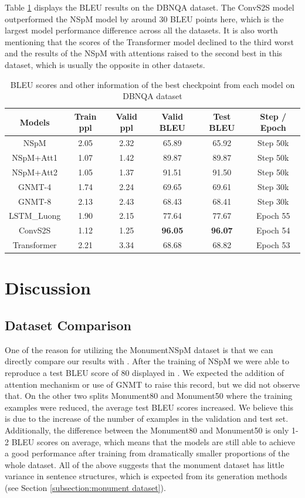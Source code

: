 Table \ref{table:dbnqa bleu} displays the BLEU results on the DBNQA dataset. The ConvS2S model outperformed the NSpM model by around 30 BLEU points here, which is the largest model performance difference across all the datasets. It is also worth mentioning that the scores of the Transformer model declined to the third worst and the results of the NSpM with attentions raised to the second best in this dataset, which is usually the opposite in other datasets.

\begin{table}[H]
\centering
\caption{BLEU scores and other information of the best checkpoint from each model on DBNQA dataset}
\label{table:dbnqa bleu}
\begin{tabular}{c|c|c|c|c|c}
Models & Train ppl & Valid ppl & \textbf{Valid BLEU} & \textbf{Test BLEU} & Step / Epoch \\
\hline
NSpM & 2.05 & 2.32 & 65.89 & 65.92 & Step 50k \\
NSpM+Att1 & 1.07 & 1.42 & 89.87 & 89.87 & Step 50k \\
NSpM+Att2 & 1.05 & 1.37 & 91.51 & 91.50 & Step 50k \\
GNMT-4 & 1.74 & 2.24 & 69.65 & 69.61 & Step 30k \\
GNMT-8 & 2.13 & 2.43 & 68.43 & 68.41 & Step 30k \\
LSTM\_Luong & 1.90 & 2.15 & 77.64 & 77.67 & Epoch 55 \\
ConvS2S & 1.12 & 1.25 & \textbf{96.05} & \textbf{96.07} & Epoch 54 \\
Transformer & 2.21 & 3.34 & 68.68 & 68.82 & Epoch 53 \\
\end{tabular}
\end{table}

\section{Discussion} \label{section:discussion}

\subsection{Dataset Comparison}

One of the reason for utilizing the MonumentNSpM dataset is that we can directly compare our results with \cite{Soru2018a}. After the training of NSpM we were able to reproduce a test BLEU score of 80 displayed in \cite{Soru2018a}. We expected the addition of attention mechanism or use of GNMT to raise this record, but we did not observe that. On the other two splits Monument80 and Monument50 where the training examples were reduced, the average test BLEU scores increased. We believe this is due to the increase of the number of examples in the validation and test set. Additionally, the difference between the Monument80 and Monument50 is only 1-2 BLEU scores on average, which means that the models are still able to achieve a good performance after training from dramatically smaller proportions of the whole dataset. All of the above suggests that the monument dataset has little variance in sentence structures, which is expected from its generation methods (see Section \ref{subsection:monument dataset}).

